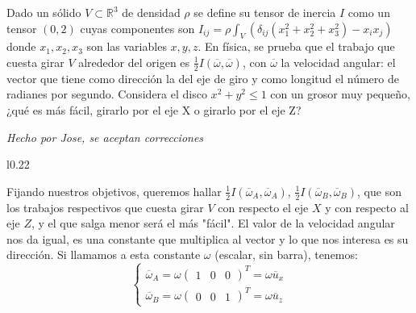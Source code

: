 \newpage
\begin{problem}[10] Dado un sólido $V\subset ℝ^3$ de densidad $\rho$ se define su tensor de inercia $I$ como un tensor $(0,2)$ cuyas componentes son $I_{ij}=\rho\int_{V}(\delta_{ij}(x^2_1+x^2_2+x^2_3)-x_ix_j)$ donde $x_1,x_2,x_3$ son las variables $x,y,z$. En física, se prueba que el trabajo que cuesta girar $V$ alrededor del origen es $\frac{1}{2}I(\overline{\omega},\overline{\omega})$, con $\overline{\omega}$ la velocidad angular: el vector que tiene como dirección la del eje de giro y como longitud el número de radianes por segundo. Considera el disco $x^2+y^2\leq1$ con un grosor muy pequeño, ¿qué es más fácil, girarlo por el eje X o girarlo por el eje Z?
	
	\solution\textit{Hecho por Jose, se aceptan correcciones}\\ 
\begin{wrapfigure}{l}{0.22\textwidth}
\end{wrapfigure}
\indent Fijando nuestros objetivos, queremos hallar $\frac{1}{2}I(\overline{\omega}_A,\overline{\omega}_A)$, $\frac{1}{2}I(\overline{\omega}_B,\overline{\omega}_B)$, que son los trabajos respectivos que cuesta girar $V$ con respecto el eje $X$ y con respecto al eje $Z$, y el que salga menor será el más "fácil". El valor de la velocidad angular nos da igual, es una constante que multiplica al vector y lo que nos interesa es su dirección. Si llamamos a esta constante $\omega$ (escalar, sin barra), tenemos: $$\begin{cases}\overline{\omega}_A=\omega\begin{pmatrix}1&0&0\end{pmatrix}^T=\omega\overline{u}_x\\\overline{\omega}_B=\omega\begin{pmatrix}0&0&1\end{pmatrix}^T=\omega\overline{u}_z\end{cases}$$

\end{problem}
